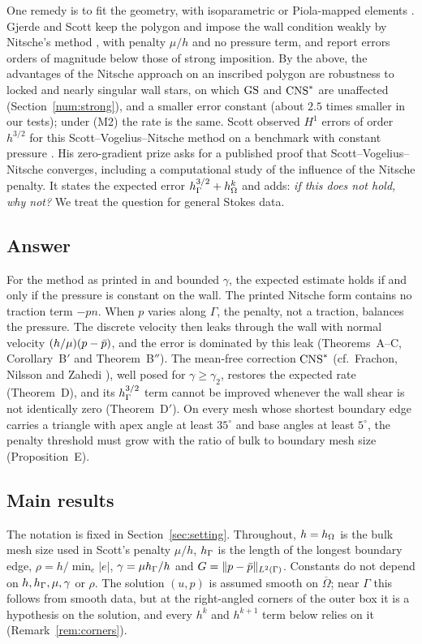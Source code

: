 One remedy is to fit the geometry, with isoparametric or Piola-mapped elements \cite{NeilanOtus2021,DurstNeilan2024}. Gjerde and Scott \cite{GjerdeScott2024} keep the polygon and impose the wall condition weakly by Nitsche's method \cite{Nitsche1971}, with penalty $\mu/h$ and no pressure term, and report errors orders of magnitude below those of strong imposition. By the above, the advantages of the Nitsche approach on an inscribed polygon are robustness to locked and nearly singular wall stars, on which $\mathrm{GS}$ and $\mathrm{CNS}^\ast$ are unaffected (Section~\ref{num:strong}), and a smaller error constant (about $2.5$ times smaller in our tests); under (M2) the rate is the same. Scott observed $H^1$ errors of order $h^{3/2}$ for this Scott--Vogelius--Nitsche method on a benchmark with constant pressure \cite{ScottPrize}. His zero-gradient prize \cite{ScottPrize} asks for a published proof that Scott--Vogelius--Nitsche converges, including a computational study of the influence of the Nitsche penalty. It states the expected error $h_\Gamma^{3/2}+h_\Omega^k$ and adds: \emph{if this does not hold, why not?} We treat the question for general Stokes data.

\subsection*{Answer}
For the method as printed in \cite[(27)--(28)]{GjerdeScott2024} and bounded $\gamma$, the expected estimate holds if and only if the pressure is constant on the wall. The printed Nitsche form contains no traction term $-pn$. When $p$ varies along $\Gamma$, the penalty, not a traction, balances the pressure. The discrete velocity then leaks through the wall with normal velocity $(h/\mu)(p-\bar p)$, and the error is dominated by this leak (Theorems~A--C, Corollary~B$'$ and Theorem~B$''$). The mean-free correction $\mathrm{CNS}^\ast$ (cf.\ Frachon, Nilsson and Zahedi \cite{FrachonNilssonZahedi2024}), well posed for $\gamma\ge\gamma_2$, restores the expected rate (Theorem~D), and its $h_\Gamma^{3/2}$ term cannot be improved whenever the wall shear is not identically zero (Theorem~D$'$). On every mesh whose shortest boundary edge carries a triangle with apex angle at least $35^\circ$ and base angles at least $5^\circ$, the penalty threshold must grow with the ratio of bulk to boundary mesh size (Proposition~E).

\subsection*{Main results}
The notation is fixed in Section~\ref{sec:setting}. Throughout, $h=h_\Omega$ is the bulk mesh size used in Scott's penalty $\mu/h$, $h_\Gamma$ is the length of the longest boundary edge, $\rho=h/\min_e|e|$, $\gamma=\mu h_\Gamma/h$ and $G=\lVert p-\bar p\rVert_{L^2(\Gamma)}$. Constants do not depend on $h,h_\Gamma,\mu,\gamma$ or $\rho$. The solution $(u,p)$ is assumed smooth on $\overline\Omega$; near $\Gamma$ this follows from smooth data, but at the right-angled corners of the outer box it is a hypothesis on the solution, and every $h^k$ and $h^{k+1}$ term below relies on it (Remark~\ref{rem:corners}).

